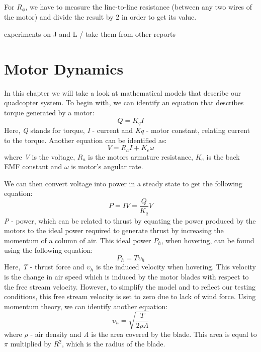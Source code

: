 For $R_{\phi}$, we have to measure the line-to-line resistance (between any two wires of the motor) and divide the result by 2 in order to get its value.

experiments on J and L / take them from other reports 

\clearpage

\section{Motor Dynamics}
In this chapter we will take a look at mathematical models that describe our quadcopter system.
To begin with, we can identify an equation that describes torque generated by a motor:
\begin{equation}
\label{torque1}
	Q = K_qI
\end{equation}
Here, \textit{Q} stands for torque, \textit{I} - current and \textit{Kq} - motor constant, relating current to the torque.
Another equation can be identified as:
\begin{equation}
\label{voltage1}
	V = R_aI + K_e\omega
\end{equation}
where \textit{V} is the voltage, \textit{$R_a$} is the motors armature resistance, \textit{$K_e$} is the back EMF constant and \textit{$\omega$} is motor's angular rate.

We can then convert voltage into power in a steady state to get the following equation:
\begin{equation}
\label{power1}
	P = IV = \frac{Q}{K_q}V
\end{equation}
\textit{P} - power, which can be related to thrust by equating the power produced by the motors to the ideal power required to generate thrust by increasing the momentum of a column of air. This ideal power \textit{$P_h$}, when hovering, can be found using the following equation:
\begin{equation}
\label{power2}
	P_h = T\upsilon_h
\end{equation}
Here, \textit{T} - thrust force and \textit{$\upsilon_h$} is the induced velocity when hovering. This velocity is the change in air speed which is induced by the motor blades with respect to the free stream velocity. However, to simplify the model and to reflect our testing conditions, this free stream velocity is set to zero due to lack of wind force.
Using momentum theory, we can identify another equation:
\begin{equation}
\label{velocity1}
	\upsilon_h = \sqrt{\frac{T}{2\rho A}}
\end{equation}
where \textit{$\rho$} - air density and \textit{A} is the area covered by the blade. This area is equal to $\pi$ multiplied by $R^2$, which is the radius of the blade.

